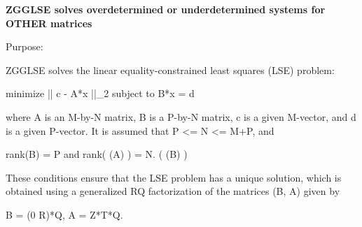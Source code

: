 {\bfseries  Z\+G\+G\+L\+S\+E solves overdetermined or underdetermined systems for O\+T\+H\+E\+R matrices} 

 \begin{DoxyParagraph}{Purpose\+: }
\begin{DoxyVerb} ZGGLSE solves the linear equality-constrained least squares (LSE)
 problem:

         minimize || c - A*x ||_2   subject to   B*x = d

 where A is an M-by-N matrix, B is a P-by-N matrix, c is a given
 M-vector, and d is a given P-vector. It is assumed that
 P <= N <= M+P, and

          rank(B) = P and  rank( (A) ) = N.
                               ( (B) )

 These conditions ensure that the LSE problem has a unique solution,
 which is obtained using a generalized RQ factorization of the
 matrices (B, A) given by

    B = (0 R)*Q,   A = Z*T*Q.\end{DoxyVerb}
 
\end{DoxyParagraph}

